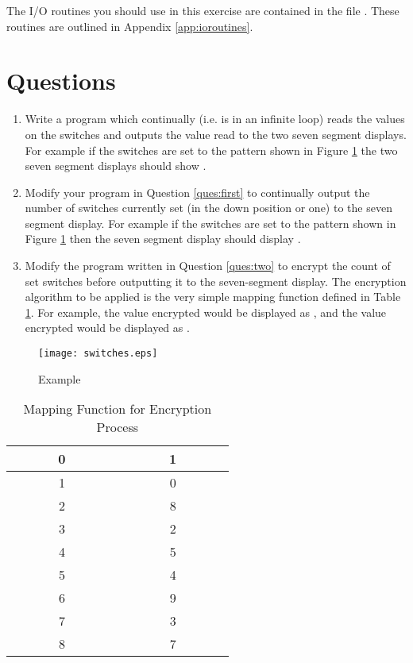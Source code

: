 \documentclass[a4paper,10pt]{article}
\begin{document}
The I/O routines you should use in this exercise are contained in the
file \LIBEXTWOP. These routines are outlined in Appendix
\ref{app:ioroutines}.

\section{Questions}
\begin{enumerate}
\item\label{ques:first} Write a program which continually (i.e. is in
an infinite loop) reads the values on the switches and outputs the
value read to the two seven segment displays.  For example if the
switches are set to the pattern shown in Figure \ref{fig:switches} the
two seven segment displays should show .

\item\label{ques:two} Modify your program in Question \ref{ques:first}
to continually output the number of switches currently set (in the
down position or one) to the seven segment display. For example if the
switches are set to the pattern shown in Figure \ref{fig:switches}
then the seven segment display should display .

\item\label{ques:final} Modify the program written in Question
\ref{ques:two} to encrypt the count of set switches before outputting
it to the seven-segment display. The encryption algorithm to be
applied is the very simple mapping function defined in Table
\ref{table:encode}. For example, the value  encrypted would be
displayed as , and the value  encrypted would be
displayed as .
\end{enumerate}

\begin{figure}[!hb]
\begin{center}
\texttt{[image: switches.eps]}
\caption{Example}
\label{fig:switches}
\end{center}
\end{figure}


\begin{table}
\begin{center}
\begin{tabular}{|c|c|}
\hline
\verb|       |0\verb|       | & \verb|       |1\verb|       | \\ \hline
1 & 0 \\ \hline
2 & 8 \\ \hline
3 & 2 \\ \hline
4 & 5 \\ \hline
5 & 4 \\ \hline
6 & 9 \\ \hline
7 & 3 \\ \hline
8 & 7 \\ 
\hline
\end{tabular}
\end{center}
\label{table:encode}
\caption{Mapping Function for Encryption Process}
\end{table}
\end{document}
